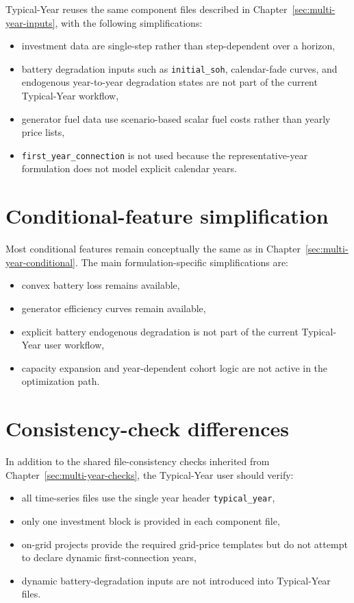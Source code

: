 \documentclass[11pt,a4paper]{report}
\newcommand{\code}[1]{\texttt{#1}}
\begin{document}
Typical-Year reuses the same component files described in Chapter~\ref{sec:multi-year-inputs}, with the following simplifications:

\begin{itemize}[leftmargin=1.5em]
  \item investment data are single-step rather than step-dependent over a horizon,
  \item battery degradation inputs such as \code{initial\_soh}, calendar-fade curves, and endogenous year-to-year degradation states are not part of the current Typical-Year workflow,
  \item generator fuel data use scenario-based scalar fuel costs rather than yearly price lists,
  \item \code{first\_year\_connection} is not used because the representative-year formulation does not model explicit calendar years.
\end{itemize}

\section{Conditional-feature simplification}

Most conditional features remain conceptually the same as in Chapter~\ref{sec:multi-year-conditional}. The main formulation-specific simplifications are:

\begin{itemize}[leftmargin=1.5em]
  \item convex battery loss remains available,
  \item generator efficiency curves remain available,
  \item explicit battery endogenous degradation is not part of the current Typical-Year user workflow,
  \item capacity expansion and year-dependent cohort logic are not active in the optimization path.
\end{itemize}

\section{Consistency-check differences}

In addition to the shared file-consistency checks inherited from Chapter~\ref{sec:multi-year-checks}, the Typical-Year user should verify:

\begin{itemize}[leftmargin=1.5em]
  \item all time-series files use the single year header \code{typical\_year},
  \item only one investment block is provided in each component file,
  \item on-grid projects provide the required grid-price templates but do not attempt to declare dynamic first-connection years,
  \item dynamic battery-degradation inputs are not introduced into Typical-Year files.
\end{itemize}
\end{document}

